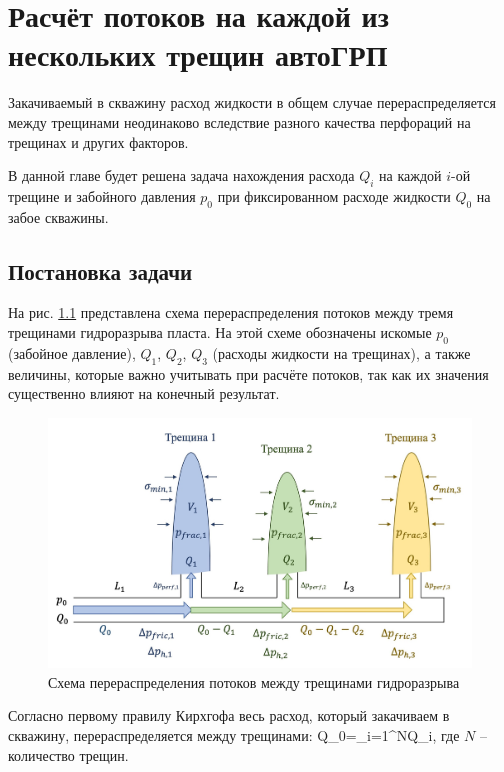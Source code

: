 \chapter{Расчёт потоков на каждой из нескольких трещин автоГРП} \label{ch3}

Закачиваемый в скважину расход жидкости в общем случае перераспределяется между трещинами неодинаково вследствие разного качества перфораций на трещинах и других факторов.

В данной главе будет решена задача нахождения расхода $Q_i$ на каждой $i$-ой трещине и забойного давления $p_0$ при фиксированном расходе жидкости $Q_0$ на забое скважины.

\section{Постановка задачи}
\vspace*{-5mm}

На рис. \ref{fig:flow_distribution_scheme} представлена схема перераспределения потоков между тремя трещинами гидроразрыва пласта.
На этой схеме обозначены искомые $p_0$ (забойное давление), $Q_1$, $Q_2$, $Q_3$ (расходы жидкости на трещинах), а также величины, которые важно учитывать при расчёте потоков, так как их значения существенно влияют на конечный результат.

\begin{figure}[H] 
\center
\includegraphics[width=\linewidth]{images/flow_distribution_scheme.jpg}
\caption{Схема перераспределения потоков между трещинами гидроразрыва} 
\label{fig:flow_distribution_scheme}  
\end{figure}

Согласно первому правилу Кирхгофа весь расход, который закачиваем в скважину, перераспределяется между трещинами:
\beq\label{3_1}
Q_0=\sum\limits_{i=1}^{N}Q_i,
\eeq
где $N$ -- количество трещин.

